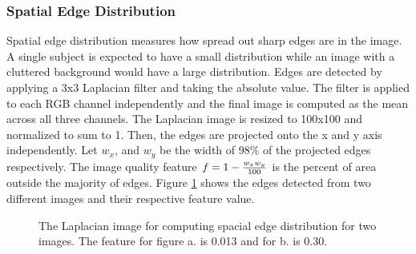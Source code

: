 \documentclass[conference,a4paper]{IEEEtran}
\begin{document}
  \subsubsection{Spatial Edge Distribution}
  Spatial edge distribution measures how spread out sharp edges are in the image.  A single subject is expected to have a small distribution while an image with a cluttered background would have a large distribution.  Edges are detected by applying a 3x3 Laplacian filter and taking the absolute value.  The filter is applied to each RGB channel independently and the final image is computed as the mean across all three channels.  The Laplacian image is resized to 100x100 and normalized to sum to 1.  Then, the edges are projected onto the x and y axis independently.  Let $w_x$, and $w_y$ be the width of 98\% of the projected edges respectively.  The image quality feature $f = 1 - {w_x w_y \over 100}$ is the percent of area outside the majority of edges.  Figure \ref{fig:sed} shows the edges detected from two different images and their respective feature value.

\begin{figure}
  \centering
  \caption{
  The Laplacian image for computing spacial edge distribution for two images.  The feature for figure a. is 0.013 and for b. is 0.30.
  }
  \label{fig:sed}
\end{figure}
\end{document}

